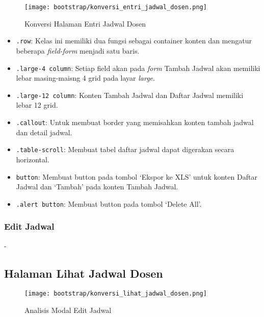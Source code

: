 \begin{figure} [H]
	\centering  
	\texttt{[image: bootstrap/konversi\_entri\_jadwal\_dosen.png]}
	\caption{Konversi Halaman Entri Jadwal Dosen}
\end{figure}
\begin{itemize}
	\item \texttt{.row}: Kelas ini memiliki dua fungsi sebagai container konten dan mengatur beberapa \textit{field-form} menjadi satu baris. 
	\item \texttt{.large-4 column}: Setiap field akan pada \textit{form} Tambah Jadwal akan memiliki lebar masing-maisng 4 grid pada layar \textit{large}.
	\item \texttt{.large-12 column}: Konten Tambah Jadwal dan Daftar Jadwal memiliki lebar 12 grid.
	\item \texttt{.callout}: Untuk membuat border yang memisahkan konten tambah jadwal dan detail jadwal.
	\item \texttt{.table-scroll}: Membuat tabel daftar jadwal dapat digerakan secara horizontal.
	\item \texttt{button}: Membuat button pada tombol `Ekspor ke XLS' untuk konten Daftar Jadwal dan `Tambah' pada konten Tambah Jadwal.
	\item \texttt{.alert button}: Membuat button pada tombol `Delete All'.
	
\end{itemize}
\subsubsection{Edit Jadwal}
-

\subsection{Halaman Lihat Jadwal Dosen}

\begin{figure} [H]
	\centering  
	\texttt{[image: bootstrap/konversi\_lihat\_jadwal\_dosen.png]}
	\caption{Analisis Modal Edit Jadwal}
\end{figure}

